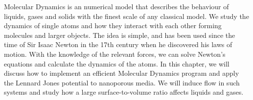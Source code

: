 Molecular Dynamics is an numerical model that describes the behaviour of liquids, gases and solids with the finest scale of any classical model. We study the dynamics of single atoms and how they interact with each other forming molecules and larger objects. The idea is simple, and has been used since the time of Sir Isaac Newton in the 17th century when he discovered his laws of motion. With the knowledge of the relevant forces, we can solve Newton's equations and calculate the dynamics of the atoms. In this chapter, we will discuss how to implement an efficient Molecular Dynamics program and apply the Lennard Jones potential to nanoporous media. We will induce flow in such systems and study how a large surface-to-volume ratio affects liquids and gases.



